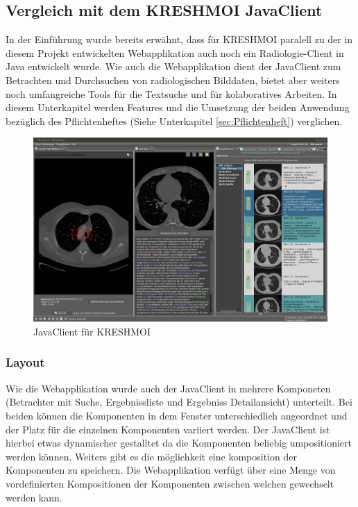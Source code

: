 \subsection{Vergleich mit dem KRESHMOI JavaClient}
\label{sec:Usability}
In der Einführung wurde bereits erwähnt, 
dass für KRESHMOI paralell zu der in diesem Projekt entwickelten Webapplikation auch noch ein Radiologie-Client in Java entwickelt wurde.
Wie auch die Webapplikation dient der JavaClient zum Betrachten und Durchsuchen von radiologischen Bilddaten,
bietet aber weiters noch umfangreiche Tools für die Textsuche und für kolaboratives Arbeiten.
In diesem Unterkapitel werden Features und die Umsetzung der beiden Anwendung bezüglich des Pflichtenheftes (Siehe Unterkapitel \ref{sec:Pflichtenheft}) verglichen.

\begin{figure}[pt]
	\centering
	\includegraphics[width=\linewidth]{img/c4_java_client.jpg}
	\caption{JavaClient für KRESHMOI}
	\label{fig:java_client}
\end{figure}

\subsubsection{Layout}
\label{sec:ua_Layout}
Wie die Webapplikation wurde auch der JavaClient in mehrere Komponeten (Betrachter mit Suche, Ergebnissliste und Ergebniss Detailansicht) unterteilt.
Bei beiden können die Komponenten in dem Fenster unterschiedlich angeordnet und der Platz für die einzelnen Komponenten variiert werden.
Der JavaClient ist hierbei etwas dynamischer gestalltet da die Komponenten beliebig umpositioniert werden können.
Weiters gibt es die möglichkeit eine komposition der Komponenten zu speichern.
Die Webapplikation verfügt über eine Menge von vordefinierten Kompositionen der Komponenten zwischen welchen gewechselt werden kann.

